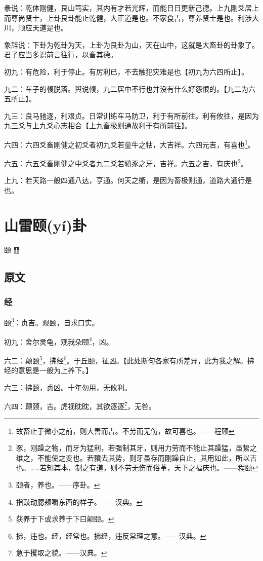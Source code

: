 \documentclass[12pt,oneside]{book}
\begin{document}
彖说：乾体刚健，艮山笃实，其内有才若光辉，而能日日更新己德。上九刚爻居上而尊尚贤士，上卦艮卦能止乾健，大正道是也。不家食吉，尊养贤士是也。利涉大川，顺应天道是也。

象辞说：下卦为乾卦为天，上卦为艮卦为山，天在山中，这就是大畜卦的卦象了。君子应当多识前言往行，以畜其德。

初九：有危险，利于停止。有厉利已，不去触犯灾难是也【初九为六四所止】。

九二：车子的輹脱落。舆说輹，九二居中不行也并没有什么好怨恨的。【九二为六五所止】。

九三：良马驰逐，利艰贞。日常训练车马防卫，利于有所前往。利有攸往，是因为九三爻与上九爻心志相合【上九畜极则通故利于有所前往】。

六四：六四爻畜刚健之初爻者初九爻若童牛之牯，大吉祥。六四元吉，有喜也\footnote{故畜止于微小之前，则大善而吉。不劳而无伤，故可喜也。——程颐}。

六五：六五爻畜刚健之中爻者九二爻若豶豕之牙，吉祥。六五之吉，有庆也\footnote{豕，刚躁之物，而牙为猛利，若强制其牙，则用力劳而不能止其躁猛，虽絷之维之，不能使之变也。若豶去其势，则牙虽存而刚躁自止，其用如此，所以吉也。……若知其本，制之有道，则不劳无伤而俗革，天下之福庆也。——程颐}。

上九：若天路一般四通八达，亨通。何天之衢，是因为畜极则通，道路大通行是也。


\chapter{山雷颐(yí)卦}
颐 {\Large ䷚}

\section{原文}

\subsection{经}
颐\footnote{颐者，养也。——序卦。}：贞吉。观颐，自求口实。

初九：舍尔灵龟，观我朵颐\footnote{指鼓动腮颊嚼东西的样子。——汉典。}，凶。

六二：颠颐\footnote{获养于下或求养于下曰颠颐。}，拂经\footnote{拂，违也。经，经常也。拂经，违反常理之意。——汉典。}。于丘颐，征凶。【此处断句各家有所差异，此为我之解。拂经的意思是一般为上养下。】

六三：拂颐，贞凶。十年勿用，无攸利。

六四：颠颐，吉。虎视眈眈，其欲逐逐\footnote{急于攫取之貌。——汉典。}，无咎。
\end{document}
